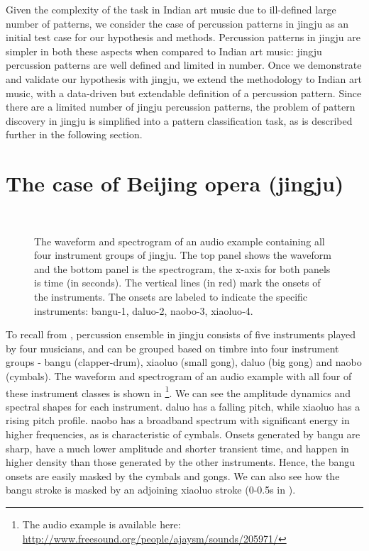 Given the complexity of the task in Indian art music due to ill-defined large number of patterns, we consider the case of percussion patterns in \gls{jingju} as an initial test case for our hypothesis and methods. Percussion patterns in \gls{jingju} are simpler in both these aspects when compared to Indian art music: \gls{jingju} percussion patterns are well defined and limited in number. Once we demonstrate and validate our hypothesis with \gls{jingju}, we extend the methodology to Indian art music, with a data-driven but extendable definition of a percussion pattern. Since there are a limited number of \gls{jingju} percussion patterns, the problem of pattern discovery in \gls{jingju} is simplified into a pattern classification task, as is described further in the following section. 
%
\section[The case of Beijing opera]{The case of Beijing opera (\Gls{jingju})}\label{sec:ppclassify:jingju}
\begin{figure}
\captionsetup[subfigure]{labelformat=empty}
\centering
{}\\ \vspace{-1cm} 
\caption[Waveform and spectrogram of \gls{jingju} percussion strokes]{The waveform and spectrogram of an audio example containing all four instrument groups of \gls{jingju}. The top panel shows the waveform and the bottom panel is the spectrogram, the x-axis for both panels is time (in seconds). The vertical lines (in red) mark the onsets of the instruments. The onsets are labeled to indicate the specific instruments: \gls{bangu}-1, \gls{daluo}-2, \gls{naobo}-3, \gls{xiaoluo}-4.}\label{fig:bo:instwavspec}
\end{figure}
To recall from , percussion ensemble in \gls{jingju} consists of five instruments played by four musicians, and can be grouped based on timbre into four instrument groups - \gls{bangu} (clapper-drum), \gls{xiaoluo} (small gong), \gls{daluo} (big gong) and \gls{naobo} (cymbals). The waveform and spectrogram of an audio example with all four of these instrument classes is shown in \footnote{The audio example is available here: \url{http://www.freesound.org/people/ajaysm/sounds/205971/}}. We can see the amplitude dynamics and spectral shapes for each instrument. \Gls{daluo} has a falling pitch, while \gls{xiaoluo} has a rising pitch profile. \Gls{naobo} has a broadband spectrum with significant energy in higher frequencies, as is characteristic of cymbals. Onsets generated by \gls{bangu} are sharp, have a much lower amplitude and shorter transient time, and happen in higher density than those generated by the other instruments. Hence, the \gls{bangu} onsets are easily masked by the cymbals and gongs. We can also see how the \gls{bangu} stroke is masked by an adjoining \gls{xiaoluo} stroke (0-0.5s in ).

